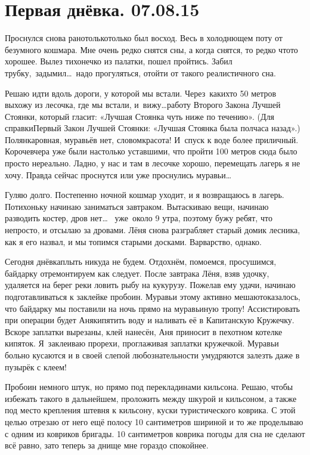 \chapter{Первая днёвка. 07.08.15}

Проснулся снова рано\mdash только\sdash только был восход. Весь в холоднющем поту от безумного кошмара. Мне очень редко снятся сны, а когда снятся, то редко что\sdash то хорошее. Вылез тихонечко из палатки, пошел пройтись. Забил трубку,~задымил\ldots ~надо прогуляться, отойти от такого реалистичного сна.

Решаю идти вдоль дороги, у которой мы встали. Через~каких\sdash то 50 метров выхожу из лесочка, где мы встали, и~вижу\ldots работу Второго Закона Лучшей Стоянки, который гласит: «Лучшая Стоянка чуть ниже по течению». (Для справки\mdash Первый Закон Лучшей Стоянки: «Лучшая Стоянка была полчаса назад».) Полянка\mdash ровная, муравьёв нет, словом\mdash красота! И~спуск к воде более приличный. Короче\mdash вчера уже были настолько уставшими, что пройти 100 метров сюда было просто нереально. Ладно, у нас и там в лесочке хорошо, перемещать лагерь я не хочу. Правда сейчас проснутся или уже проснулись муравьи\ldots~

Гуляю долго. Постепенно ночной кошмар уходит, и я возвращаюсь в лагерь. Потихоньку начинаю заниматься завтраком. Вытаскиваю вещи, начинаю разводить костер, дров нет\ldots~ уже~около 9 утра, поэтому бужу ребят, что непросто, и отсылаю за дровами. Лёня снова разграбляет старый домик лесника, как я его назвал, и мы топимся старыми досками. Варварство, однако. 

Сегодня днёвка\mdash плыть никуда не будем. Отдохнём, помоемся, просушимся, байдарку отремонтируем как следует. После завтрака Лёня, взяв удочку, удаляется на берег реки ловить рыбу на кукурузу. Пожелав ему удачи, начинаю подготавливаться к заклейке пробоин. Муравьи этому активно мешают\mdash оказалось, что байдарку мы поставили на ночь прямо на муравьиную тропу! Ассистировать при операции будет Аня\mdash кипятить воду и наливать её в Капитанскую Кружечку. Вскоре заплатки вырезаны, клей нанесён, Аня приносит в пехотном котелке кипяток. Я~заклеиваю прорехи, проглаживая заплатки кружечкой. Муравьи больно кусаются и в своей слепой любознательности умудряются залезть даже в пузырёк с клеем! 

Пробоин немного штук, но прямо под перекладинами кильсона. Решаю, чтобы избежать такого в дальнейшем, проложить между шкурой и кильсоном, а также под место крепления штевня к кильсону, куски туристического коврика. С этой целью отрезаю от него ещё полосу 10 сантиметров шириной и то же проделываю с одним из ковриков бригады. 10 сантиметров коврика погоды для сна не сделают всё равно, зато теперь за днище мне гораздо спокойнее. 


